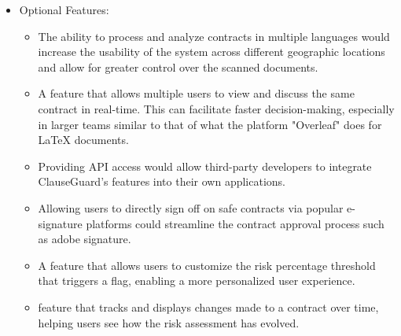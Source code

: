 \begin{itemize}
\begin{itemize}
    \end{itemize}

    \item Optional Features: 
    \begin{itemize}
        \item The ability to process and analyze contracts in multiple languages would increase the usability of the system across different geographic locations and allow for greater control over the scanned documents.
        \item A feature that allows multiple users to view and discuss the same contract in real-time. This can facilitate faster decision-making, especially in larger teams similar to that of what the platform "Overleaf" does for LaTeX documents.
        \item Providing API access would allow third-party developers to integrate ClauseGuard's features into their own applications.
        \item Allowing users to directly sign off on safe contracts via popular e-signature platforms could streamline the contract approval process such as adobe signature. 
        \item A feature that allows users to customize the risk percentage threshold that triggers a flag, enabling a more personalized user experience.
        \item  feature that tracks and displays changes made to a contract over time, helping users see how the risk assessment has evolved.

    \end{itemize}

\end{itemize}




